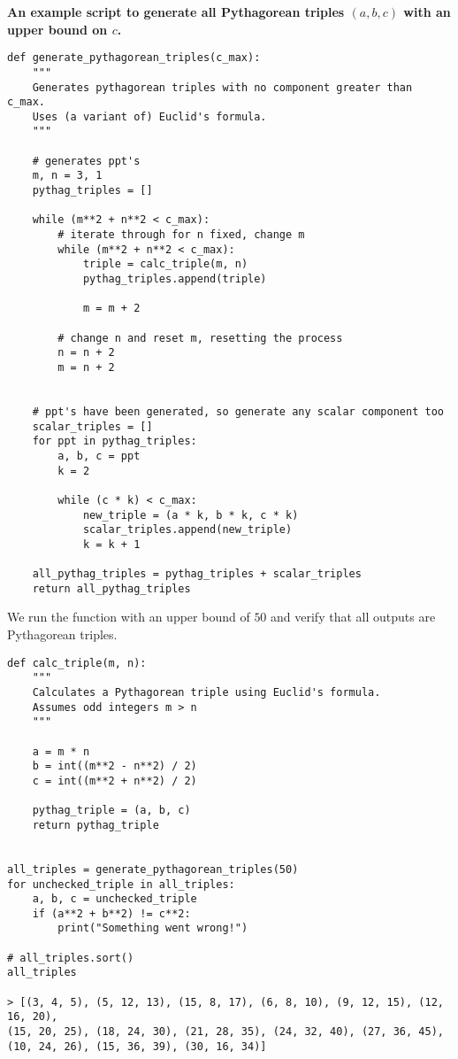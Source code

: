 \documentclass[12pt]{article}
\begin{document}
\pagebreak 
\noindent \textbf{An example script to generate all Pythagorean triples $(a, b, c)$ with an upper bound on $c$.}

\begin{verbatim}
def generate_pythagorean_triples(c_max):
    """
    Generates pythagorean triples with no component greater than c_max.
    Uses (a variant of) Euclid's formula.
    """

    # generates ppt's
    m, n = 3, 1
    pythag_triples = []

    while (m**2 + n**2 < c_max):
        # iterate through for n fixed, change m
        while (m**2 + n**2 < c_max):
            triple = calc_triple(m, n)
            pythag_triples.append(triple)

            m = m + 2

        # change n and reset m, resetting the process
        n = n + 2
        m = n + 2 


    # ppt's have been generated, so generate any scalar component too
    scalar_triples = []
    for ppt in pythag_triples:
        a, b, c = ppt
        k = 2

        while (c * k) < c_max:
            new_triple = (a * k, b * k, c * k)
            scalar_triples.append(new_triple)
            k = k + 1
            
    all_pythag_triples = pythag_triples + scalar_triples
    return all_pythag_triples
\end{verbatim}
We run the function with an upper bound of $50$ and verify that all outputs are Pythagorean triples.
\begin{verbatim}
def calc_triple(m, n):
    """
    Calculates a Pythagorean triple using Euclid's formula.
    Assumes odd integers m > n
    """
    
    a = m * n
    b = int((m**2 - n**2) / 2)
    c = int((m**2 + n**2) / 2)

    pythag_triple = (a, b, c)
    return pythag_triple


all_triples = generate_pythagorean_triples(50)
for unchecked_triple in all_triples:
    a, b, c = unchecked_triple
    if (a**2 + b**2) != c**2:
        print("Something went wrong!")

# all_triples.sort()
all_triples

> [(3, 4, 5), (5, 12, 13), (15, 8, 17), (6, 8, 10), (9, 12, 15), (12, 16, 20),
(15, 20, 25), (18, 24, 30), (21, 28, 35), (24, 32, 40), (27, 36, 45), 
(10, 24, 26), (15, 36, 39), (30, 16, 34)]


\end{verbatim}
\end{document}
